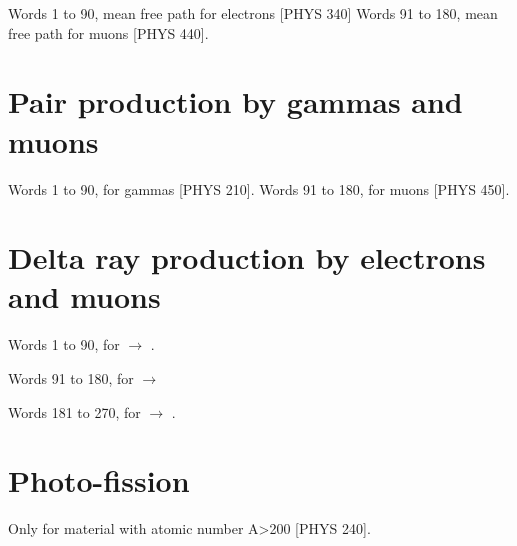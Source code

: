 Words 1 to 90, mean free path for electrons [PHYS 340]
Words 91 to 180, mean free path for muons [PHYS 440].
 
\section{Pair production by gammas and muons}
 
Words 1 to 90, for gammas [PHYS 210].
Words 91 to 180, for muons [PHYS 450].
 
\section{Delta ray production by electrons and muons}
 
Words 1 to 90, for \Pem\Pem $\rightarrow$ \Pem\Pem [PHYS 330].
 
Words 91 to 180, for \Pep\Pem $\rightarrow$ \Pep\Pem [PHYS 330]
 
Words 181 to 270, for \Pem $\rightarrow$ \Pem [PHYS 430].
 
\section{Photo-fission}
 
Only for material with atomic number A>200 [PHYS 240].
%
 
 
